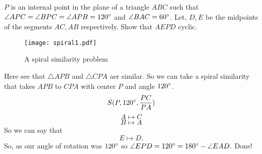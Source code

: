 \begin{example}
$P$ is an internal point in the plane of a triangle $ABC$ such that $\angle APC=\angle BPC=\angle APB=120^\circ$ and $\angle BAC =60^\circ$. Let, $D,E$ be the midpoints of the segments $AC,AB$ respectively. Show that $AEPD$ cyclic.
\end{example}
\begin{figure}[ht]
\centering
	\texttt{[image: spiral1.pdf]}
	\caption{A spiral similarity problem}
\end{figure}
Here see that $\triangle APB$ and $\triangle CPA$ aer similar.
So we can take a spiral similarity that takes $APB$ to $CPA$ with center $P$ and angle $120^\circ$.
\[S(P,120^\circ,\frac{PC}{PA})\]
\[A\mapsto C\]
\[B\mapsto A\]
So we can say that \[E\mapsto D.\]
So, as our angle of rotation was $120^\circ$ so $\angle EPD=120^\circ=180^\circ - \angle EAD.$
Done!







